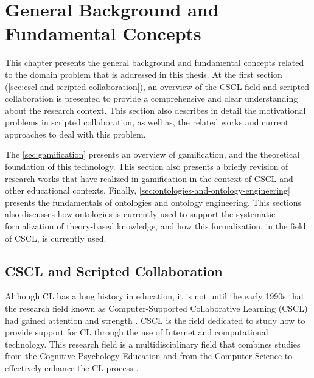 
\chapter{General Background and Fundamental Concepts}
\label{chapter:general-background}

This chapter presents the general background and fundamental concepts related to the domain problem that is addressed in this thesis.
At the first section (\autoref{sec:cscl-and-scripted-collaboration}), an overview of the CSCL field and scripted collaboration is presented to provide a comprehensive and clear understanding about the research context.
This section also describes in detail the motivational problems in scripted collaboration, as well as, the related works and current approaches to deal with this problem.

The \autoref{sec:gamification} presents an overview of gamification, and the theoretical foundation of this technology.
This section also presents a briefly revision of research works that have realized in gamification in the context of CSCL and other educational contexts.
Finally, \autoref{sec:ontologies-and-ontology-engineering} presents the fundamentals of ontologies and ontology engineering.
This sections also discusses how ontologies is currently used to support the systematic formalization of theory-based knowledge, and how this formalization, in the field of CSCL, is currently used.

\section{CSCL and Scripted Collaboration}
\label{sec:cscl-and-scripted-collaboration}

Although CL has a long history in education, it is not until the early 1990s that the research field known as Computer-Supported Collaborative Learning (CSCL) had gained attention and strength \cite{StahlKoschmannSuthers2006}.
CSCL is the field dedicated to study how to provide support for CL through the use of Internet and computational technology.
This research field is a multidisciplinary field that combines studies from the Cognitive Psychology Education and from the Computer Science to effectively enhance the CL process \cite{HoppeOgataSoller2007}.

